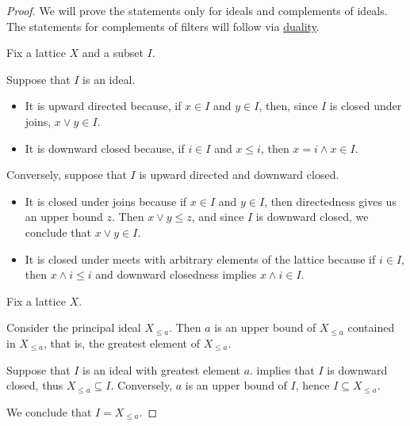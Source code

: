 \begin{proof}
  We will prove the statements only for ideals and complements of ideals. The statements for complements of filters will follow via \hyperref[thm:lattice_duality]{duality}.

   Fix a lattice \( X \) and a subset \( I \).

  \SufficiencySubProof* Suppose that \( I \) is an ideal.

  \begin{itemize}
    \item It is upward directed because, if \( x \in I \) and \( y \in I \), then, since \( I \) is closed under joins, \( x \vee y \in I \).
    \item It is downward closed because, if \( i \in I \) and \( x \leq i \), then \( x = i \wedge x \in I \).
  \end{itemize}

  \NecessitySubProof* Conversely, suppose that \( I \) is upward directed and downward closed.

  \begin{itemize}
    \item It is closed under joins because if \( x \in I \) and \( y \in I \), then directedness gives us an upper bound \( z \). Then \( x \vee y \leq z \), and since \( I \) is downward closed, we conclude that \( x \vee y \in I \).

    \item It is closed under meets with arbitrary elements of the lattice because if \( i \in I \), then \( x \wedge i \leq i \) and downward closedness implies \( x \wedge i \in I \).
  \end{itemize}

   Fix a lattice \( X \).

  \SufficiencySubProof* Consider the principal ideal \( X_{\leq a} \). Then \( a \) is an upper bound of \( X_{\leq a} \) contained in \( X_{\leq a} \), that is, the greatest element of \( X_{\leq a} \).

  \NecessitySubProof* Suppose that \( I \) is an ideal with greatest element \( a \).  implies that \( I \) is downward closed, thus \( X_{\leq a} \subseteq I \). Conversely, \( a \) is an upper bound of \( I \), hence \( I \subseteq X_{\leq a} \).

  We conclude that \( I = X_{\leq a} \).


\end{proof}

